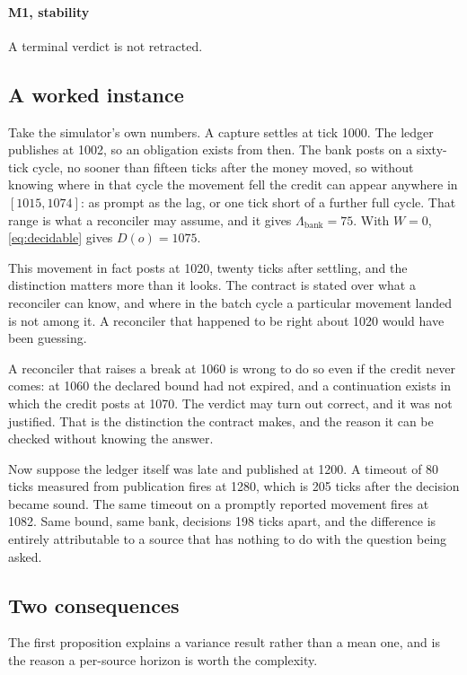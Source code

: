 \documentclass[10pt,conference]{IEEEtran}
\begin{document}
\paragraph{M1, stability} A terminal verdict is not retracted.

\subsection{A worked instance}

Take the simulator's own numbers. A capture settles at tick 1000. The ledger
publishes at 1002, so an obligation exists from then. The bank posts on a
sixty-tick cycle, no sooner than fifteen ticks after the money moved, so
without knowing where in that cycle the movement fell the credit can appear anywhere in $[1015, 1074]$: as prompt as the lag, or one
tick short of a further full cycle. That range is what a reconciler may assume, and it gives
$\Lambda_{\mathrm{bank}} = 75$. With $W = 0$, \eqref{eq:decidable} gives
$D(o) = 1075$.

This movement in fact posts at 1020, twenty ticks after settling, and the
distinction matters more than it looks. The contract is stated over what a
reconciler can know, and where in the batch cycle a particular movement landed
is not among it. A reconciler that happened to be right about 1020 would have
been guessing.

A reconciler that raises a break at 1060 is wrong to do so even if the credit
never comes: at 1060 the declared bound had not expired, and a continuation
exists in which the credit posts at 1070. The verdict may turn out correct, and
it was not justified. That is the distinction the contract makes, and the reason
it can be checked without knowing the answer.

Now suppose the ledger itself was late and published at 1200. A timeout of 80 ticks measured from publication fires at 1280, which is 205
ticks after the decision became sound. The same timeout on a promptly reported movement fires at 1082.
Same bound, same bank, decisions 198 ticks apart, and the difference is entirely
attributable to a source that has nothing to do with the question being asked.

\subsection{Two consequences}

The first proposition explains a variance result rather than a mean one, and is
the reason a per-source horizon is worth the complexity.
\end{document}
